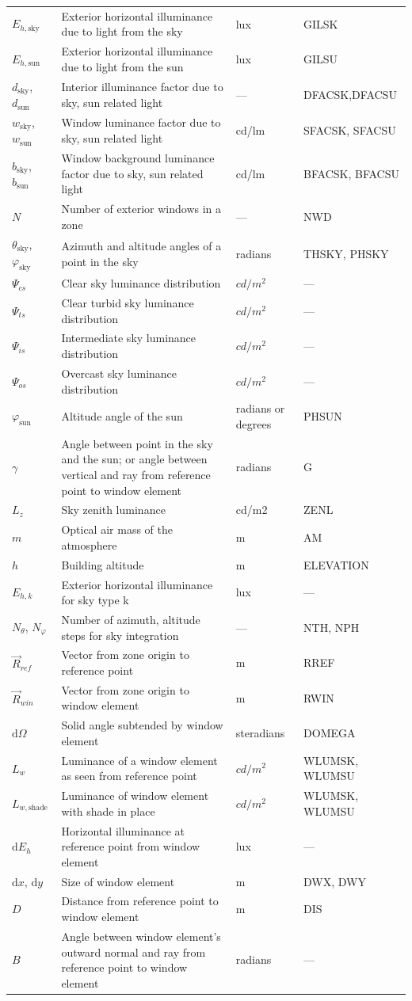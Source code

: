 \begin{longtable}[c]{p{1.25in}p{2.0in}p{1.25in}p{1.5in}}
$E_{h,\text{sky}}$ & Exterior horizontal illuminance due to light from the sky & lux & GILSK \tabularnewline
$E_{h,\text{sun}}$ & Exterior horizontal illuminance due to light from the sun & lux & GILSU \tabularnewline
$d_{\text{sky}}$, $d_{\text{sun}}$ & Interior illuminance factor due to sky, sun related light & --- & DFACSK,DFACSU \tabularnewline
$w_{\text{sky}}$, $w_{\text{sun}}$ & Window luminance factor due to sky, sun related light & cd/lm & SFACSK, SFACSU \tabularnewline
$b_{\text{sky}}$, $b_{\text{sun}}$ & Window background luminance factor due to sky, sun related light & cd/lm & BFACSK, BFACSU \tabularnewline
$N$ & Number of exterior windows in a zone & --- & NWD \tabularnewline
$\theta_{\text{sky}}$, $\varphi_{\text{sky}}$ & Azimuth and altitude angles of a point in the sky & radians & THSKY, PHSKY \tabularnewline
$\Psi_{cs}$ & Clear sky luminance distribution & $cd/m^2$ & --- \tabularnewline
$\Psi_{ts}$ & Clear turbid sky luminance distribution & $cd/m^2$ & --- \tabularnewline
$\Psi_{is}$ & Intermediate sky luminance distribution & $cd/m^2$ & --- \tabularnewline
$\Psi_{os}$ & Overcast sky luminance distribution & $cd/m^2$ & --- \tabularnewline
$\varphi_{\text{sun}}$ & Altitude angle of the sun & radians or degrees & PHSUN \tabularnewline
$\gamma$ & Angle between point in the sky and the sun; or angle between vertical and ray from reference point to window element & radians & G \tabularnewline
$L_z$ & Sky zenith luminance & cd/m2 & ZENL \tabularnewline
$m$ & Optical air mass of the atmosphere & m & AM \tabularnewline
$h$ & Building altitude & m & ELEVATION \tabularnewline
$E_{h,k}$ & Exterior horizontal illuminance for sky type k & lux & --- \tabularnewline
$N_{\theta}$, $N_{\varphi}$ & Number of azimuth, altitude steps for sky integration & --- & NTH, NPH \tabularnewline
$\vec{R}_{ref}$ & Vector from zone origin to reference point & m & RREF \tabularnewline
$\vec{R}_{win}$ & Vector from zone origin to window element & m & RWIN \tabularnewline
$\mathrm{d}\Omega$ & Solid angle subtended by window element & steradians & DOMEGA \tabularnewline
$L_w$ & Luminance of a window element as seen from reference point & $cd/m^2$ & WLUMSK, WLUMSU \tabularnewline
$L_{w,\text{shade}}$ & Luminance of window element with shade in place & $cd/m^2$ & WLUMSK, WLUMSU \tabularnewline
$\mathrm{d}E_h$ & Horizontal illuminance at reference point from window element & lux & --- \tabularnewline
$\mathrm{d}x$, $\mathrm{d}y$ & Size of window element & m & DWX, DWY \tabularnewline
$D$ & Distance from reference point to window element & m & DIS \tabularnewline
$B$ & Angle between window element's outward normal and ray from reference point to window element & radians & --- \tabularnewline

\end{longtable}
